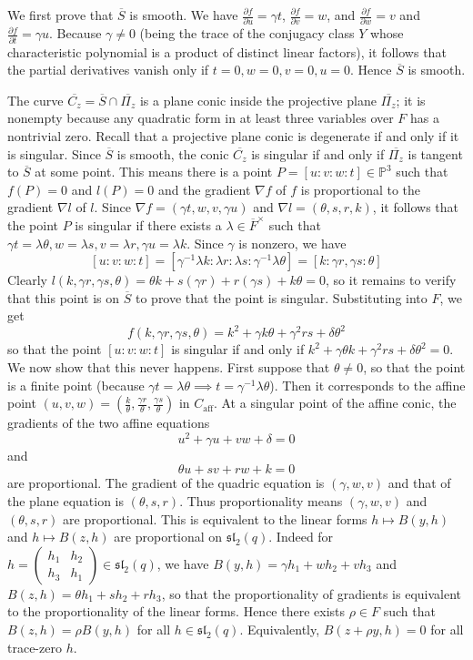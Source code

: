 \documentclass[preprint,11pt]{amsart}
\def\P{\mathbb{P}}
\theoremstyle{definition}
\numberwithin{thm}{section}
\newcommand{\gam}{\gamma}
\def\sl{\mathfrak{sl}}
\newcommand{\lam}{\lambda}
\newcommand{\aff}{\textrm{aff}}
\newcommand{\ol}[1]{\overline{#1}}
\begin{document}
We first prove that $\ol{S}$ is smooth. We have $\frac{\partial f}{\partial u} = \gam t$, $\frac{\partial f}{\partial v} = w$, and $\frac{\partial f}{\partial w} = v$ and $\frac{\partial f}{\partial t} = \gam u$. Because $\gam \neq 0$ (being the trace of the conjugacy class $Y$ whose characteristic polynomial is a product of distinct linear factors), it follows that the partial derivatives vanish only if $t = 0, w = 0, v= 0, u = 0$. Hence $\ol{S}$ is smooth.

The curve $\ol{C_z} = \ol{S} \cap \ol{\Pi_z}$ is a plane conic inside the projective plane $\ol{\Pi_z}$; it is nonempty because any quadratic form in at least three variables over $F$ has a nontrivial zero. Recall that a projective plane conic is degenerate if and only if it is singular. Since $\ol{S}$ is smooth, the conic $\ol{C_z}$ is singular if and only if $\ol{\Pi_z}$ is tangent to $\ol{S}$ at some point. This means there is a point $P = [u:v:w :t] \in \P^3$ such that $f(P) = 0$ and $l(P) = 0$ and the gradient $\nabla f$  of $f$ is proportional to the gradient $\nabla l$ of $l$. Since $\nabla f = (\gam t, w, v, \gam u)$ and $\nabla l = (\theta, s, r, k)$, it follows that the point $P$ is singular if there exists a $\lam \in \ol{F}^{\times}$ such that $\gam t = \lam \theta, w = \lam s, v = \lam r, \gam u = \lam k$. Since $\gam$ is nonzero, we have
$$
[u:v : w : t] = [\gam^{-1} \lam k : \lam r : \lam s : \gam^{-1} \lam \theta ] = [k:\gam r, \gam s : \theta]
$$
Clearly $l(k,\gam r, \gam s, \theta) = \theta k + s(\gam r) + r (\gam s) + k \theta = 0$, so it remains to verify that this point is on $\ol{S}$ to prove that the point is singular.  Substituting into $F$, we get
$$
f(k, \gam r, \gam s, \theta) = k^2 + \gam k \theta + \gam^2 r s + \delta \theta^2
$$
so that the point $[u:v:w:t]$ is singular if and only if $k^2 + \gam \theta k + \gam^2 r s + \delta \theta^2 = 0$. We now show that this never happens. First suppose that $\theta \neq 0$, so that the point is a finite point (because $\gam t = \lam \theta \implies t = \gam^{-1} \lam \theta$). Then it corresponds to the affine point $(u,v,w) = \left(\frac{k}{\theta}, \frac{\gam r} {\theta}, \frac{\gam s} { \theta} \right)$ in $C_{\aff}$. At a singular point of the affine conic, the gradients of the two affine equations 
$$
u^2 + \gam u + v w + \delta = 0
$$
and
$$
\theta u + s v + r w + k = 0
$$
are proportional. The gradient of the quadric equation is $(\gam, w, v)$ and that of the plane equation is $(\theta, s, r)$. Thus proportionality means $(\gam, w, v)$ and $(\theta, s, r)$ are proportional. This is equivalent to the linear forms $h \mapsto B(y,h)$ and $h \mapsto B(z,h)$ are proportional on $\sl_2(q)$. Indeed for $h = \begin{pmatrix} h_1 & h_2 \\ h_3 & h_1 \end{pmatrix} \in \sl_2(q)$, we have $B(y,h) = \gam h_1 + w h_2 + v h_3$	 and $B(z, h) = \theta h_1 + s h_2 + r h_3$, so that the proportionality of gradients is equivalent to the proportionality of the linear forms.  Hence there exists $\rho \in F$ such that $B(z,h) = \rho B(y,h)$ for all $h \in \sl_2(q)$. Equivalently, $B(z + \rho y, h) = 0$ for all trace-zero $h$.
\end{document}
